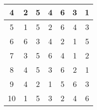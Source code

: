 \begin{table}[]
\begin{tabular}{|c|c|c|c|c|c|c|}
    4                                                        & 2                                                 & 5                                                 & 4                                                 & 6                                                 & 3                                                 & 1                                                 \\ \hline
    5                                                        & 1                                                 & 5                                                 & 2                                                 & 6                                                 & 4                                                 & 3                                                 \\ \hline
    6                                                        & 6                                                 & 3                                                 & 4                                                 & 2                                                 & 1                                                 & 5                                                 \\ \hline
    7                                                        & 3                                                 & 5                                                 & 6                                                 & 4                                                 & 1                                                 & 2                                                 \\ \hline
    8                                                        & 4                                                 & 5                                                 & 3                                                 & 6                                                 & 2                                                 & 1                                                 \\ \hline
    9                                                        & 4                                                 & 2                                                 & 1                                                 & 5                                                 & 6                                                 & 3                                                 \\ \hline
    10                                                       & 1                                                 & 5                                                 & 3                                                 & 2                                                 & 4                                                 & 6                                                 \\ \hline

\end{tabular}
\end{table}
